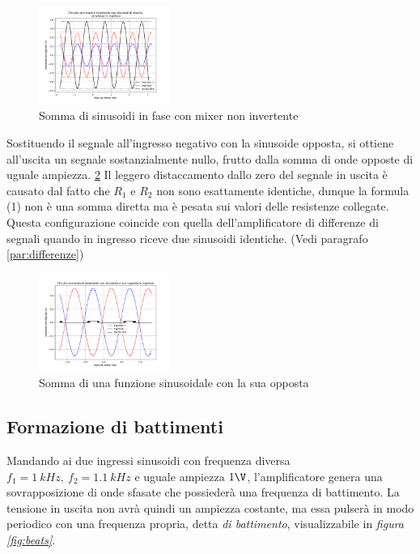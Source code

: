 \documentclass[journal]{IEEEtran}
\begin{document}
\begin{figure}[H]%
\begin {center}
\includegraphics[width=0.38\textwidth]{analysis/output/OPA_mixer_sin3.pdf}
\caption{Somma di sinusoidi in fase con mixer non invertente}
\label{fig:Mixer3}
\end {center}
\end{figure}

Sostituendo il segnale all'ingresso negativo con la sinusoide opposta, si ottiene all'uscita un segnale sostanzialmente nullo, frutto dalla somma di onde opposte di uguale ampiezza. \ref{fig:Mixer2} Il leggero distaccamento dallo zero del segnale in uscita è causato dal fatto che $R_1$ e $R_2$ non sono esattamente identiche, dunque la formula (1) non è una somma diretta ma è pesata sui valori delle resistenze collegate. Questa configurazione coincide con quella dell'amplificatore di differenze di segnali quando in ingresso riceve due sinusoidi identiche. (Vedi paragrafo \ref{par:differenze})

\begin{figure}[H]%
\begin {center}
\includegraphics[width=0.38\textwidth]{analysis/output/OPA_mixer_sin2.pdf}
\caption{Somma di una funzione sinusoidale con la sua opposta}
\label{fig:Mixer2}
\end {center}
\end{figure}

\subsection{Formazione di battimenti}
Mandando ai due ingressi sinusoidi con frequenza diversa $f_1 = 1\ kHz, \ f_2 = 1.1\ kHz$ e uguale ampiezza $1 \V$, l'amplificatore genera una sovrapposizione di onde sfasate che possiederà una frequenza di battimento. La tensione in uscita non avrà quindi un ampiezza costante, ma essa pulserà in modo periodico con una frequenza propria, detta \textit{di battimento}, visualizzabile in \textit{figura \ref{fig:beats}}.
\end{document}
